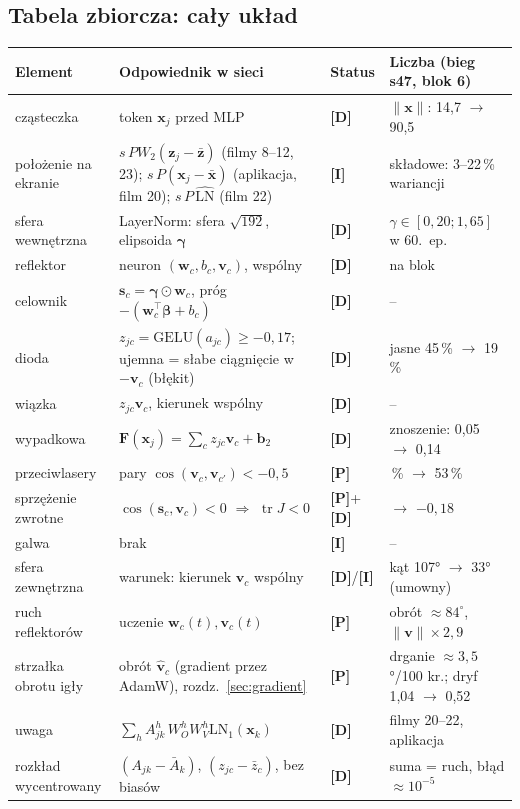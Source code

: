 \documentclass[a4paper,11pt]{article}
\newcommand{\stD}{\textcolor{dok}{\textsf{\textbf{[D]}}}}
\newcommand{\stP}{\textcolor{pom}{\textsf{\textbf{[P]}}}}
\newcommand{\stI}{\textcolor{ilu}{\textsf{\textbf{[I]}}}}
\newcommand{\LN}{\mathrm{LN}}
\newcommand{\GELU}{\mathrm{GELU}}
\newcommand{\tr}{\operatorname{tr}}
\begin{document}
\subsection*{Tabela zbiorcza: cały układ}
\begin{longtable}{>{\raggedright\arraybackslash}p{3.0cm}>{\raggedright\arraybackslash}p{6.0cm}>{\raggedright\arraybackslash}p{1.4cm}>{\raggedright\arraybackslash}p{4.6cm}}
\toprule
\textbf{Element} & \textbf{Odpowiednik w sieci} & \textbf{Status} & \textbf{Liczba (bieg s47, blok 6)}\\\midrule\endhead
cząsteczka & token $\bm x_j$ przed MLP & \stD & $\lVert\bm x\rVert$: 14,7 $\to$ 90,5\\
położenie na ekranie & $s\,PW_2(\bm z_j-\bar{\bm z})$ (filmy 8--12, 23); $s\,P(\bm x_j-\bar{\bm x})$ (aplikacja, film 20); $s\,P\,\widehat{\LN}$ (film 22) & \stI & 3 składowe: 3--22\,\% wariancji\\
sfera wewnętrzna & LayerNorm: sfera $\sqrt{192}$, elipsoida $\bm\gamma$ & \stD & $\gamma\in[0{,}20;1{,}65]$ w 60.~ep.\\
reflektor & neuron $(\bm w_c,b_c,\bm v_c)$, wspólny & \stD & 768 na blok\\
celownik & $\bm s_c=\bm\gamma\odot\bm w_c$, próg $-(\bm w_c^{\!\top}\bm\beta+b_c)$ & \stD & --\\
dioda & $z_{jc}=\GELU(a_{jc})\ge-0{,}17$; ujemna = słabe ciągnięcie w $-\bm v_c$ (błękit) & \stD & jasne 45\,\% $\to$ 19\,\%\\
wiązka & $z_{jc}\bm v_c$, kierunek wspólny & \stD & --\\
wypadkowa & $\bm F(\bm x_j)=\sum_c z_{jc}\bm v_c+\bm b_2$ & \stD & znoszenie: 0,05 $\to$ 0,14\\
przeciwlasery & pary $\cos(\bm v_c,\bm v_{c'})<-0{,}5$ & \stP & 0\,\% $\to$ 53\,\%\\
sprzężenie zwrotne & $\cos(\bm s_c,\bm v_c)<0$ $\Rightarrow$ $\tr J<0$ & \stP+\stD & 0 $\to$ $-0{,}18$\\
galwa & brak & \stI & --\\
sfera zewnętrzna & warunek: kierunek $\bm v_c$ wspólny & \stD/\stI & kąt 107° $\to$ 33° (umowny)\\
ruch reflektorów & uczenie $\bm w_c(t),\bm v_c(t)$ & \stP & obrót $\approx84^\circ$, $\lVert\bm v\rVert\times2{,}9$\\
strzałka obrotu igły & obrót $\hat{\bm v}_c$ (gradient przez AdamW), rozdz.~\ref{sec:gradient} & \stP & drganie $\approx3{,}5$°/100 kr.; dryf 1,04 $\to$ 0,52\\
uwaga & $\sum_h A^h_{jk}\,W^h_OW^h_V\LN_1(\bm x_k)$ & \stD & filmy 20--22, aplikacja\\
rozkład wycentrowany & $(A_{jk}-\bar A_k)$, $(z_{jc}-\bar z_c)$, bez biasów & \stD & suma = ruch, błąd $\approx10^{-5}$\\
\bottomrule
\end{longtable}
\end{document}

